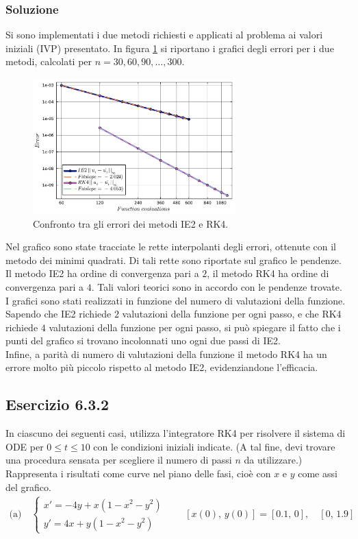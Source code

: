 \documentclass[letterpaper, 12pt]{article}
\numberwithin{equation}{section}    %
\begin{document}
\subsubsection{Soluzione}
Si sono implementati i due metodi richiesti e applicati al problema ai valori iniziali (IVP) presentato.
In figura \ref{fig:es6_3_1} si riportano i grafici degli errori per i due metodi,
calcolati per $n=30,60,90,\ldots,300$.
\begin{figure}[!ht]
    \centering
    \includegraphics[width=0.7\textwidth]{6311.pdf}
    \caption{Confronto tra gli errori dei metodi IE2 e RK4.}
    \label{fig:es6_3_1}
\end{figure}
Nel grafico sono state tracciate le rette interpolanti degli errori, ottenute con il metodo dei minimi quadrati. 
Di tali rette sono riportate sul grafico le pendenze. Il metodo IE2 ha ordine di convergenza pari a $2$, 
il metodo RK4 ha ordine di convergenza pari a $4$. Tali valori teorici sono in accordo con le pendenze trovate.\\
I grafici sono stati realizzati in funzione del numero di valutazioni della funzione. Sapendo che IE2 richiede $2$
valutazioni della funzione per ogni passo, e che RK4 richiede $4$ valutazioni della funzione per ogni passo,
si può spiegare il fatto che i punti del grafico si trovano incolonnati uno ogni due passi di IE2. \\
Infine, a parità di numero di valutazioni della funzione il metodo RK4 ha un errore molto più 
piccolo rispetto al metodo IE2, evidenziandone l'efficacia.

\newpage

\subsection{Esercizio 6.3.2}
\label{es:6_3_2}
In ciascuno dei seguenti casi, utilizza l'integratore RK4 per risolvere il sistema di ODE per $0\le t \le 10$ 
con le condizioni iniziali indicate. (A tal fine, devi trovare una procedura sensata per scegliere il 
numero di passi $n$ da utilizzare.) Rappresenta i risultati come curve nel piano delle fasi, cioè con $x$ e $y$ 
come assi del grafico.
\begin{align*}
\text{(a)}\quad 
\begin{cases}
x' = -4y + x(1 - x^2 - y^2) \\
y' = 4x + y(1 - x^2 - y^2)
\end{cases}
\qquad
[x(0),\, y(0)] = [0.1,\, 0],\quad [0,\, 1.9]
\end{align*}
\end{document}
